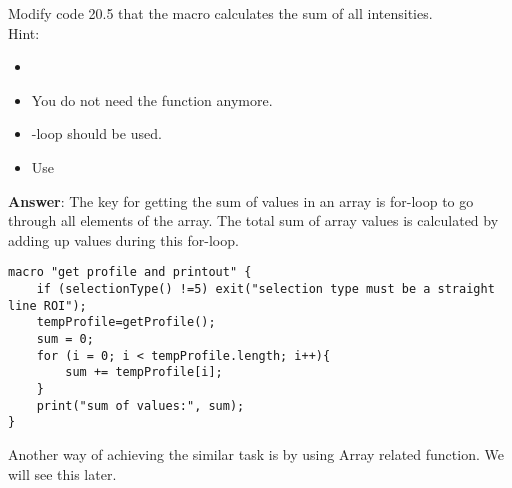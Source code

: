 \begin{indentexercise}{1}
Modify code 20.5 that the macro calculates the sum of all intensities.\\

Hint:

\begin{itemize}
\item
\item You do not need the function anymore. 
\item {}-loop should be used.
\item Use 
\end{itemize}

\item \textbf{Answer}: The key for getting the sum of values in an array is for-loop to go through all elements of the array. The total sum of array values is calculated by adding up values during this for-loop.   
\begin{lstlisting}[numbers=none]
macro "get profile and printout" {
	if (selectionType() !=5) exit("selection type must be a straight line ROI");
	tempProfile=getProfile();
	sum = 0;
	for (i = 0; i < tempProfile.length; i++){
		sum += tempProfile[i];
	}
	print("sum of values:", sum);
}  
\end{lstlisting}

Another way of achieving the similar task is by using Array related function. We will see this later. 
\end{indentexercise}
